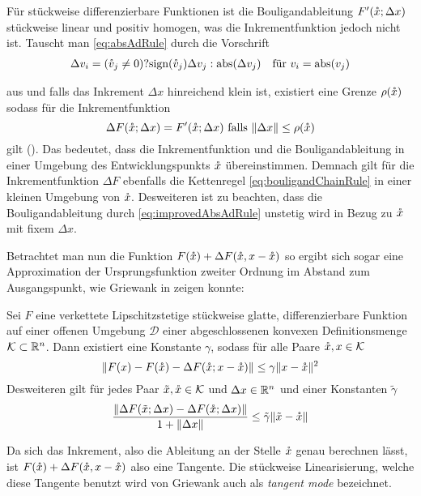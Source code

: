 Für stückweise differenzierbare Funktionen ist die Bouligandableitung $F'(\mathring{x};\Delta x)$ stückweise linear und positiv homogen, was die Inkrementfunktion jedoch nicht ist.
Tauscht man \eqref{eq:absAdRule} durch die Vorschrift
\begin{equation}
 \label{eq:improvedAbsAdRule}
 \begin{aligned}
  \Delta v_i &= (\mathring{v}_j \neq 0)?\text{sign}(\mathring{v}_j)\Delta v_j:\operatorname{abs}(\Delta v_j) &\text{für } v_i = \operatorname{abs}(v_j)
 \end{aligned}
\end{equation}

aus und falls das Inkrement $\Delta x$ hinreichend klein ist, existiert eine Grenze $\rho(\mathring{x})$ sodass für die Inkrementfunktion 
 \[
  \Delta F(\mathring{x};\Delta x) = F'(\mathring{x};\Delta x)\text{ falls }\|\Delta x\|\leq \rho(\mathring{x})
 \]
gilt  (\cite[S.10 ff]{monster}). Das bedeutet, dass die Inkrementfunktion und die Bouligandableitung in einer Umgebung des Entwicklungspunkts $\mathring{x}$ übereinstimmen. Demnach gilt für die Inkrementfunktion $\Delta F$ ebenfalls die Kettenregel \eqref{eq:bouligandChainRule} in einer kleinen Umgebung von $\mathring{x}$. Desweiteren ist zu beachten, dass die Bouligandableitung durch \eqref{eq:improvedAbsAdRule} unstetig wird in Bezug zu $\mathring{x}$ mit fixem $\Delta x$.

Betrachtet man nun die Funktion $F(\mathring{x})+\Delta F(\mathring{x}, x-\mathring{x})$ so ergibt sich sogar eine Approximation der Ursprungsfunktion zweiter Ordnung im Abstand zum Ausgangspunkt, wie Griewank in \cite[Prop.1]{monster} zeigen konnte:

\begin{theorem}
 Sei $F$ eine verkettete Lipschitzstetige stückweise glatte, differenzierbare Funktion auf einer offenen Umgebung $\mathcal D$ einer abgeschlossenen konvexen Definitionsmenge $\mathcal K \subset \mathbb{R}^n$. Dann existiert eine Konstante $\gamma$, sodass für alle Paare $\mathring{x},x\in \mathcal K$
 \[
  \|F(x) - F(\mathring{x}) - \Delta F(\mathring{x};x-\mathring{x})\| \leq \gamma \|x-\mathring{x}\|^2
 \]
 Desweiteren gilt für jedes Paar $\tilde x,\mathring{x}\in \mathcal K$ und $\Delta x\in \mathbb{R}^n$ und einer Konstanten $\tilde\gamma$
 \[
  \frac{\|\Delta F(\tilde x;\Delta x) - \Delta F(\mathring{x};\Delta x)\|}{1+\|\Delta x\|}\leq \tilde \gamma \|\tilde x - \mathring{x}\|
 \]
\end{theorem}
Da sich das Inkrement, also die Ableitung an der Stelle $\mathring{x}$ genau berechnen lässt, ist $F(\mathring{x})+\Delta F(\mathring{x}, x-\mathring{x})$ also eine Tangente. Die stückweise Linearisierung, welche diese Tangente benutzt wird von Griewank auch als \textit{tangent mode} bezeichnet. 

